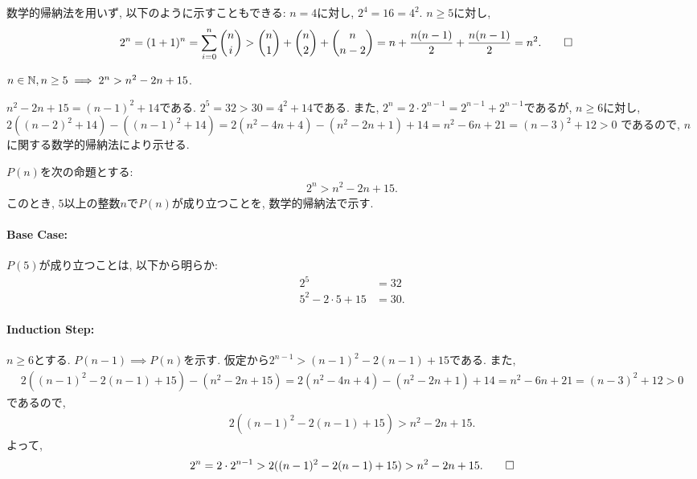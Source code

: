 \begin{rem}
  数学的帰納法を用いず, 以下のように示すこともできる:
  $n=4$に対し, $2^4=16=4^2$.
  $n\geq 5$に対し, 
  \begin{align*}
    2^n=(1+1)^n=\sum_{i=0}^n \binom{n}{i}
    &> \binom{n}{1}+\binom{n}{2}+\binom{n}{n-2}
    =n+\frac{n(n-1)}{2}+\frac{n(n-1)}{2}
    =n^2
    .\qedhere
  \end{align*}
\end{rem}

\newest
\begin{prop}
  \label{p:20230816}
$n\in\mathbb{N}, n\geq 5\implies 2^n> n^2-2n+15$.
\end{prop}
\begin{proof**}
  $n^2-2n+15=(n-1)^2+14$である.
  $2^5=32 > 30=4^2+14$である.
  また,
  $2^n=2\cdot 2^{n-1}=2^{n-1}+2^{n-1}$であるが,
  $n\geq 6$に対し,
  $2((n-2)^2+14)-((n-1)^2+14)=2(n^2-4n+4)-(n^2-2n+1)+14=n^2-6n+21=(n-3)^2+12>0$
  であるので,
  $n$に関する数学的帰納法により示せる.
\end{proof**}
\begin{proof*}
  $P(n)$を次の命題とする:
  \begin{align*}
    2^n > n^2-2n+15
    .
  \end{align*}
  このとき,
  $5$以上の整数$n$で$P(n)$が成り立つことを,
  数学的帰納法で示す.

  \paragraph{Base Case:}
  $P(5)$が成り立つことは, 以下から明らか:
  \begin{align*}
    2^5&=32\\
    5^2-2\cdot 5+15&=30.
  \end{align*}
  \paragraph{Induction Step:}
  $n\geq 6$とする.
  $P(n-1)\implies P(n)$を示す.
  仮定から$2^{n-1} > (n-1)^2-2(n-1)+15$である.
  また,
  \begin{align*}
    2((n-1)^2-2(n-1)+15)-(n^2-2n+15)=2(n^2-4n+4)-(n^2-2n+1)+14=n^2-6n+21=(n-3)^2+12>0
  \end{align*}
  であるので,
  \begin{align*}
    2((n-1)^2-2(n-1)+15)>n^2-2n+15.
  \end{align*}
  よって,
  \begin{align*}
    2^n=2\cdot 2^{n-1}>2((n-1)^2-2(n-1)+15)>n^2-2n+15
    .\qedhere
  \end{align*}
\end{proof*}

